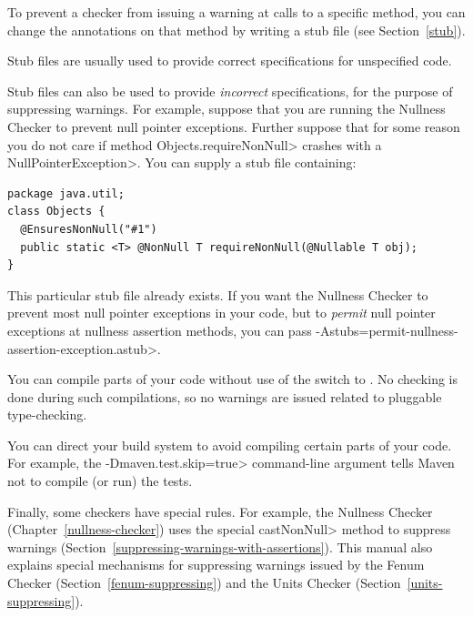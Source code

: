 
To prevent a checker from issuing a warning at calls to a specific method,
you can change the annotations on that method by writing a stub file (see
Section~\ref{stub}).

Stub files are usually used to provide correct specifications for
unspecified code.

Stub files can also be used to provide \emph{incorrect} specifications, for
the purpose of suppressing warnings.  For example, suppose that you are
running the Nullness Checker to prevent null pointer exceptions.  Further
suppose that for some reason you do not care if method
\<Objects.requireNonNull> crashes with a \<NullPointerException>.  You can
supply a stub file containing:

\begin{Verbatim}
package java.util;
class Objects {
  @EnsuresNonNull("#1")
  public static <T> @NonNull T requireNonNull(@Nullable T obj);
}
\end{Verbatim}

This particular stub file already exists.
If you want the Nullness Checker to prevent most null
pointer exceptions in your code, but to \emph{permit} null pointer
exceptions at nullness assertion methods, you can pass
\<-Astubs=permit-nullness-assertion-exception.astub>.



You can compile parts of your code without use of the
 switch to .  No checking is done during
such compilations, so no warnings are issued related to pluggable
type-checking.

You can direct your build system to avoid compiling certain parts of your
code.  For example, the \<-Dmaven.test.skip=true> command-line argument
tells Maven not to compile (or run) the tests.



Finally, some checkers have special rules.  For example, the Nullness
Checker (Chapter~\ref{nullness-checker}) uses
the special \<castNonNull> method to suppress warnings
(Section~\ref{suppressing-warnings-with-assertions}).
This manual also explains special mechanisms for
suppressing warnings issued by the Fenum Checker
(Section~\ref{fenum-suppressing}) and the Units Checker
(Section~\ref{units-suppressing}).


